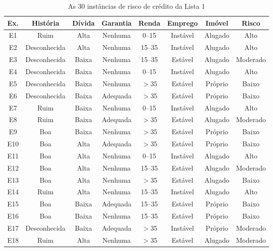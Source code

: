 \documentclass[12pt, a4paper]{article}
\begin{document}
\begin{table}[H]
  \centering
  \caption{As 30 instâncias de risco de crédito da Lista 1}
  \label{tab:30_instancias}
  \renewcommand{\arraystretch}{1.12}
  \scriptsize
  \begin{tabular}{cccccccc}
    \toprule
    \textbf{Ex.} & \textbf{História} & \textbf{Dívida} & \textbf{Garantia} & \textbf{Renda} & \textbf{Emprego} & \textbf{Imóvel} & \textbf{Risco} \\
    \midrule
E1  & Ruim          & Alta  & Nenhuma   & 0--15  & Instável & Alugado & Alto \\
E2  & Desconhecida  & Alta  & Nenhuma   & 15--35 & Instável & Alugado & Alto \\
E3  & Desconhecida  & Baixa & Nenhuma   & 15--35 & Estável  & Alugado & Moderado \\
E4  & Desconhecida  & Baixa & Nenhuma   & 0--15  & Instável & Alugado & Alto \\
E5  & Desconhecida  & Baixa & Nenhuma   & $>$35  & Estável  & Próprio & Baixo \\
E6  & Desconhecida  & Baixa & Adequada  & $>$35  & Estável  & Próprio & Baixo \\
E7  & Ruim          & Baixa & Nenhuma   & 0--15  & Instável & Alugado & Alto \\
E8  & Ruim          & Baixa & Adequada  & $>$35  & Estável  & Alugado & Moderado \\
E9  & Boa           & Baixa & Nenhuma   & $>$35  & Estável  & Próprio & Baixo \\
E10 & Boa           & Alta  & Adequada  & $>$35  & Estável  & Próprio & Baixo \\
E11 & Boa           & Alta  & Nenhuma   & 0--15  & Instável & Alugado & Alto \\
E12 & Boa           & Alta  & Nenhuma   & 15--35 & Estável  & Alugado & Moderado \\
E13 & Boa           & Alta  & Nenhuma   & $>$35  & Estável  & Alugado & Baixo \\
E14 & Ruim          & Alta  & Nenhuma   & 15--35 & Instável & Alugado & Alto \\
E15 & Boa           & Baixa & Adequada  & 15--35 & Estável  & Próprio & Baixo \\
E16 & Boa           & Baixa & Nenhuma   & 15--35 & Estável  & Próprio & Baixo \\
E17 & Desconhecida  & Baixa & Adequada  & $>$35  & Instável & Próprio & Moderado \\
E18 & Ruim          & Alta  & Nenhuma   & $>$35  & Estável  & Alugado & Moderado \\

\end{tabular}
\end{table}
\end{document}

